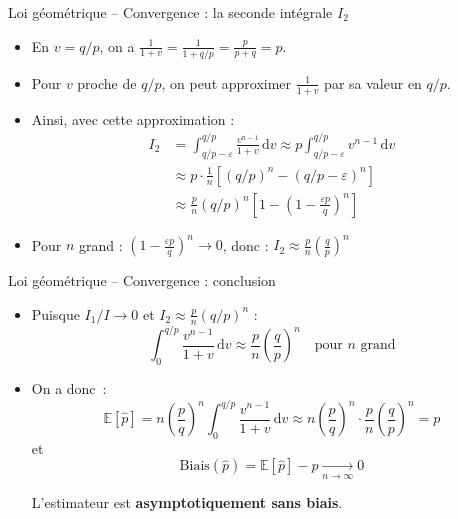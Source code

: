 \documentclass[11pt,aspectratio=169]{beamer}
\newcommand{\dd}{\mathrm{d}}
\begin{document}
\begin{frame}{Loi géométrique -- Convergence : la seconde intégrale $I_2$}

\begin{itemize}

\item En $v = q/p$, on a $\frac{1}{1+v} = \frac{1}{1 + q/p} = \frac{p}{p+q} = p$.\newline

\item Pour $v$ proche de $q/p$, on peut approximer $\frac{1}{1+v}$ par sa valeur en $q/p$.\newline

\item Ainsi, avec cette approximation :
  \[
    \begin{split}
      I_2 &= \int_{q/p - \varepsilon}^{q/p} \frac{v^{n-1}}{1+v} \, \dd v \approx p \int_{q/p - \varepsilon}^{q/p} v^{n-1} \, \dd v\\
          &\approx p \cdot \frac{1}{n}\left[(q/p)^n - (q/p - \varepsilon)^n\right]\\
          &\approx \frac{p}{n}(q/p)^n \left[1 - \left(1 - \frac{\varepsilon p}{q}\right)^n\right]
    \end{split}
\]

\item Pour $n$ grand : $\left(1 - \frac{\varepsilon p}{q}\right)^n \to 0$, donc : $I_2 \approx \frac{p}{n}\left(\frac{q}{p}\right)^n$

\end{itemize}


\end{frame}

\begin{frame}{Loi géométrique -- Convergence : conclusion}

  \begin{itemize}

  \item Puisque $I_1/I \to 0$ et $I_2 \approx \frac{p}{n}(q/p)^n$ :
    \[
      \int_0^{q/p} \frac{v^{n-1}}{1+v} \, \dd v \approx \frac{p}{n}\left(\frac{q}{p}\right)^n \quad \text{pour } n \text{ grand}
    \]


  \item On a donc~:
    \[
      \mathbb{E}[\hat{p}] = n \left(\frac{p}{q}\right)^n \int_0^{q/p} \frac{v^{n-1}}{1+v} \, \dd v \approx n \left(\frac{p}{q}\right)^n \cdot \frac{p}{n}\left(\frac{q}{p}\right)^n = p
    \]
    et
    \[
      \boxed{\text{Biais}(\hat{p}) = \mathbb{E}[\hat{p}] - p \xrightarrow[n \to \infty]{} 0}
    \]

    L'estimateur est \textbf{asymptotiquement sans biais}.
  \end{itemize}

\end{frame}
\end{document}
